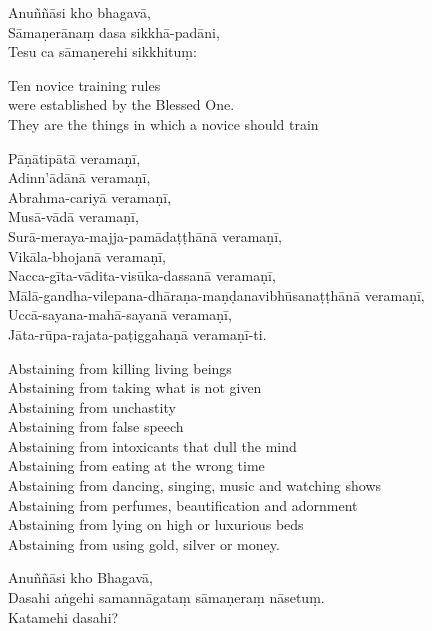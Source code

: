 
Anuññāsi kho bhagavā,\\
Sāmaṇerānaṃ dasa sikkhā-padāni,\\
Tesu ca sāmaṇerehi sikkhituṃ:\\

\begin{english}
  Ten novice training rules\\
  were established by the Blessed One.\\
  They are the things in which a novice should train
\end{english}

Pāṇātipātā veramaṇī,\\
Adinn'ādānā veramaṇī,\\
Abrahma-cariyā veramaṇī,\\
Musā-vādā veramaṇī,\\
Surā-meraya-majja-pamādaṭṭhānā veramaṇī,\\
Vikāla-bhojanā veramaṇī,\\
Nacca-gīta-vādita-visūka-dassanā veramaṇī,\\
Mālā-gandha-vilepana-dhāraṇa-maṇḍanavibhūsanaṭṭhānā veramaṇī,\\
Uccā-sayana-mahā-sayanā veramaṇī,\\
Jāta-rūpa-rajata-paṭiggahaṇā veramaṇī-ti.

\begin{english}
  Abstaining from killing living beings\\
  Abstaining from taking what is not given\\
  Abstaining from unchastity\\
  Abstaining from false speech\\
  Abstaining from intoxicants that dull the mind\\
  Abstaining from eating at the wrong time\\
  Abstaining from dancing, singing, music and watching shows\\
  Abstaining from perfumes, beautification and adornment\\
  Abstaining from lying on high or luxurious beds\\
  Abstaining from using gold, silver or money.
\end{english}


Anuññāsi kho Bhagavā,\\
Dasahi aṅgehi samannāgataṃ sāmaṇeraṃ nāsetuṃ.\\
Katamehi dasahi?

